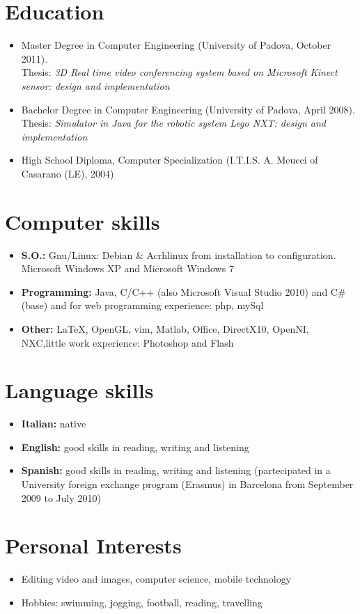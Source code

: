 \documentclass[pdftex,a4paper,10pt,twoside,titlepage,italian]{article}
\begin{document}
\section*{Education}
\begin{itemize}
	\item Master Degree in Computer Engineering (University of Padova, October 2011).\\
	Thesis: {\itshape 3D Real time video conferencing system based on Microsoft Kinect sensor: design and implementation }
	\item Bachelor Degree in Computer Engineering (University of Padova, April 2008). \\Thesis:
	{\itshape Simulator in Java for the robotic system Lego NXT: design and implementation}
	\item High School Diploma, Computer Specialization (I.T.I.S. A. Meucci of Casarano (LE), 2004)
\end{itemize}

\section*{Computer skills}
\begin{itemize}
	\item \textbf{S.O.:} Gnu/Linux: Debian \& Acrhlinux from installation to configuration. Microsoft Windows XP and Microsoft Windows 7
	\item \textbf{Programming:} Java, C/C++ (also Microsoft Visual Studio 2010) and C\# (base) and for web programming experience: php, mySql
	\item \textbf{Other:} \LaTeX, OpenGL, vim, Matlab, Office, DirectX10, OpenNI,
	NXC,little work experience: Photoshop and Flash
\end{itemize}
\section*{Language skills}
\begin{itemize}
	\item \textbf{Italian:} native
	\item \textbf{English:} good skills in reading, writing and listening
	\item \textbf{Spanish:} good skills in reading, writing and listening (partecipated in a University foreign exchange program (Erasmus) in Barcelona from September 2009 to July 2010)
\end{itemize}
\section*{Personal Interests}
\begin{itemize}
	\item Editing video and images, computer science, mobile technology
	\item Hobbies: swimming, jogging, football, reading, travelling
\end{itemize}
\end{document}
